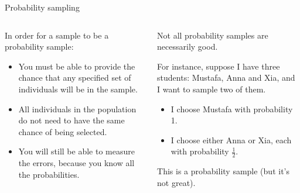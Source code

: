\documentclass[aspectratio=169]{../latex_main/tntbeamer}  %
\begin{document}
	
		\begin{frame}{Probability sampling}
	    \begin{columns}
	        \begin{column}{.4\textwidth}
	            In order for a sample to be a probability sample:
	            \begin{itemize}
	                \item You must be able to provide the chance that any specified set of individuals will be in the sample.
	               \item All individuals in the population do not need to have the same chance of being selected.
	                \item You will still be able to measure the errors, because you know all the probabilities.
	            \end{itemize}
	        \end{column}
	        
	        \begin{column}{.5\textwidth}
	            Not all probability samples are necessarily good.
	            \bigskip
             
	            For instance, suppose I have three students: Mustafa, Anna and Xia, and I want to sample two of them.
	            \begin{itemize}
	                \item I choose Mustafa with probability 1.
	                \item I choose either  Anna or Xia, each with probability $\frac{1}{2}$.
	            \end{itemize}
	            This is a probability sample (but it’s not great).

	        \end{column}
	        
	    \end{columns}
	    
	\end{frame}
	
\end{document}

